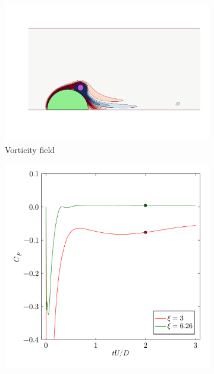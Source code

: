 \documentclass[10pt,a4paper]{article}
\begin{document}
\begin{figure}
    \centering
    \begin{subfigure}[t]{0.8\linewidth}
        \centering
        \includegraphics[width=\linewidth,trim={50 70 20 210},clip]{img/SpinCylFlood.pdf}
        \vspace{-1cm}
        \caption{Vorticity field}
    \end{subfigure}
    \begin{subfigure}[b]{0.38\linewidth}
        \includegraphics[width=\linewidth]{img/SpinCylHist.pdf}

\end{subfigure}
\end{figure}
\end{document}
